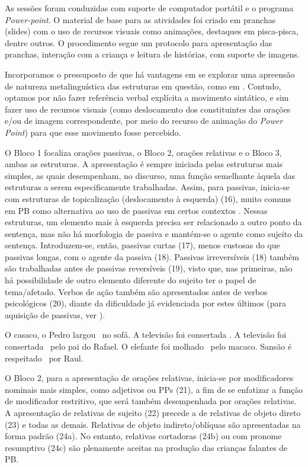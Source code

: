\documentclass[output=paper,colorlinks,citecolor=brown,booklanguage=portuguese]{langscibook}
\begin{document}
As sessões foram conduzidas com suporte de computador portátil e o programa \emph{Power-point}. O material de base para as atividades foi criado em pranchas (slides) com o uso de recursos visuais como animações, destaques em pisca-pisca, dentre outros. O procedimento segue um protocolo para apresentação das pranchas, interação com a criança e leitura de histórias, com suporte de imagens.

Incorporamos o pressuposto de que há vantagens em se explorar uma apreensão de natureza metalinguística das estruturas em questão, como em \citet{Levy2009}. Contudo, optamos por não fazer referência verbal explícita a movimento sintático, e sim fazer uso de recursos visuais (como deslocamento dos constituintes das orações e/ou de imagem correspondente, por meio do recurso de animação do \emph{Power Point}) para que esse movimento fosse percebido. 

O Bloco 1 focaliza orações passivas, o Bloco 2, orações relativas e o Bloco 3, ambas as estruturas. A apresentação é sempre iniciada pelas estruturas mais simples, as quais desempenham, no discurso, uma função semelhante àquela das estruturas a serem especificamente trabalhadas. Assim, para passivas, inicia-se com estruturas de topicalização (deslocamento à esquerda) (16), muito comuns em PB como alternativa ao uso de passivas em certos contextos \citep{Gabriel2001}. Nessas estruturas, um elemento mais à esquerda precisa ser relacionado a outro ponto da sentença, mas não há morfologia de passiva e mantém-se o agente como sujeito da sentença. Introduzem-se, então, passivas curtas (17), menos custosas do que passivas longas, com o agente da passiva (18). Passivas irreversíveis (18) também são trabalhadas antes de passivas reversíveis (19), visto que, nas primeiras, não há possibilidade de outro elemento diferente do sujeito ter o papel de tema/afetado. Verbos de ação também são apresentados antes de verbos psicológicos (20), diante da dificuldade já evidenciada por estes últimos (para aquisição de passivas, ver \citet{Correa2017}).    


\ea\label{ex:14:16}	O casaco, o Pedro largou \longrule ~no sofá.
\z
\ea\label{ex:14:17} 	A televisão foi consertada \longrule.
\z
\ea\label{ex:14:18} 	A televisão foi consertada \longrule ~pelo pai do Rafael.
\z
\ea\label{ex:14:19} 	O elefante foi molhado \longrule ~pelo macaco.
\z
\ea\label{ex:14:20}	Sansão é respeitado \longrule ~por Raul.
\z

O Bloco 2, para a apresentação de orações relativas, inicia-se por modificadores nominais mais simples, como adjetivos ou PPs (21), a fim de se enfatizar a função de modificador restritivo, que será também desempenhada por orações relativas. A apresentação de relativas de sujeito (22) precede a de relativas de objeto direto (23) e todas as demais. Relativas de objeto indireto/oblíquas são apresentadas na forma padrão (24a). No entanto, relativas cortadoras (24b) ou com pronome resumptivo (24c) são plenamente aceitas na produção das crianças falantes de PB. 
\end{document}

